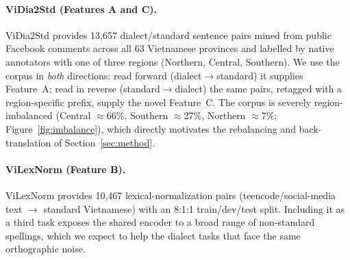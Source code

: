 \documentclass[11pt]{article}
\begin{document}
\paragraph{ViDia2Std (Features A and C).}
ViDia2Std \citep{ta2026vidia2std} provides 13{,}657 dialect/standard sentence
pairs mined from public Facebook comments across all 63 Vietnamese provinces and
labelled by native annotators with one of three regions (Northern, Central,
Southern). We use the corpus in \emph{both} directions: read forward
(dialect$\rightarrow$standard) it supplies Feature~A; read in reverse
(standard$\rightarrow$dialect) the same pairs, retagged with a region-specific
prefix, supply the novel Feature~C. The corpus is severely region-imbalanced
(Central $\approx$66\%, Southern $\approx$27\%, Northern $\approx$7\%;
Figure~\ref{fig:imbalance}), which directly motivates the rebalancing and
back-translation of Section~\ref{sec:method}.

\paragraph{ViLexNorm (Feature B).}
ViLexNorm \citep{nguyen2024vilexnorm} provides 10{,}467 lexical-normalization
pairs (teencode/social-media text $\rightarrow$ standard Vietnamese) with an
8:1:1 train/dev/test split. Including it as a third task exposes the shared
encoder to a broad range of non-standard spellings, which we expect to help the
dialect tasks that face the same orthographic noise.

\end{document}
